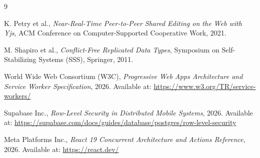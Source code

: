 \documentclass[12pt,a4paper]{report}
\begin{document}
\cleardoublepage
\begin{thebibliography}{9}

K. Petry et al., \textit{Near-Real-Time Peer-to-Peer Shared Editing on the Web with Yjs}, ACM Conference on Computer-Supported Cooperative Work, 2021.

M. Shapiro et al., \textit{Conflict-Free Replicated Data Types}, Symposium on Self-Stabilizing Systems (SSS), Springer, 2011.

World Wide Web Consortium (W3C), \textit{Progressive Web Apps Architecture and Service Worker Specification}, 2026. Available at: \url{https://www.w3.org/TR/service-workers/}

Supabase Inc., \textit{Row-Level Security in Distributed Mobile Systems}, 2026. Available at: \url{https://supabase.com/docs/guides/database/postgres/row-level-security}

Meta Platforms Inc., \textit{React 19 Concurrent Architecture and Actions Reference}, 2026. Available at: \url{https://react.dev/}

\end{thebibliography}
\end{document}
